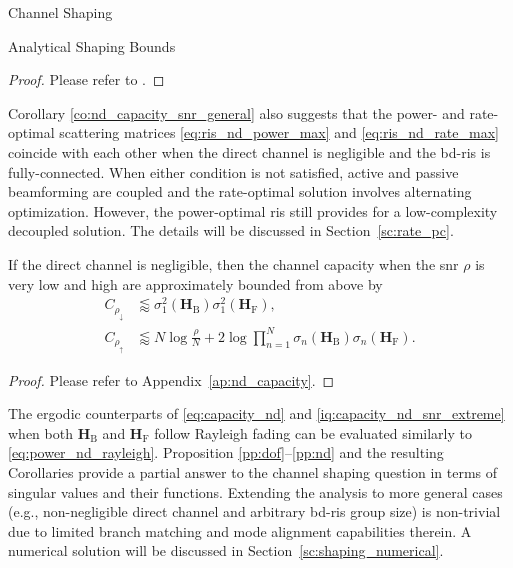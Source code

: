 \documentclass[journal]{IEEEtran}
\begin{document}
\begin{section}{Channel Shaping}
\begin{subsection}{Analytical Shaping Bounds}
		\begin{proof}
			Please refer to \cite[Appendix~A]{Bartoli2023}.
		\end{proof}

		Corollary \ref{co:nd_capacity_snr_general} also suggests that the power- and rate-optimal scattering matrices \eqref{eq:ris_nd_power_max} and \eqref{eq:ris_nd_rate_max} coincide with each other when the direct channel is negligible and the \gls{bd}-\gls{ris} is fully-connected.
		When either condition is not satisfied, active and passive beamforming are coupled and the rate-optimal solution involves alternating optimization.
		However, the power-optimal \gls{ris} still provides for a low-complexity decoupled solution.
		The details will be discussed in Section~\ref{sc:rate_pc}.

		\begin{corollary}
			\label{co:nd_capacity_snr_extreme}
			If the direct channel is negligible, then the channel capacity when the \gls{snr} $\rho$ is very low and high are approximately bounded from above by
			\begin{subequations}
				\label{iq:capacity_nd_snr_extreme}
				\begin{align}
					C_{\rho_\downarrow} & \lessapprox \sigma_1^2(\mathbf{H}_\mathrm{B}) \sigma_1^2(\mathbf{H}_\mathrm{F}), \label{iq:capacity_nd_snr_low}                                           \\
					C_{\rho_\uparrow}   & \lessapprox N \log \frac{\rho}{N} + 2 \log \prod_{n=1}^N \sigma_n(\mathbf{H}_\mathrm{B}) \sigma_n(\mathbf{H}_\mathrm{F}). \label{iq:capacity_nd_snr_high}
				\end{align}
			\end{subequations}
		\end{corollary}

		\begin{proof}
			Please refer to Appendix~\ref{ap:nd_capacity}.
		\end{proof}

		The ergodic counterparts of \eqref{eq:capacity_nd} and \eqref{iq:capacity_nd_snr_extreme} when both $\mathbf{H}_\mathrm{B}$ and $\mathbf{H}_\mathrm{F}$ follow Rayleigh fading can be evaluated similarly to \eqref{eq:power_nd_rayleigh}.
		Proposition \ref{pp:dof}--\ref{pp:nd} and the resulting Corollaries provide a partial answer to the channel shaping question in terms of singular values and their functions.
		Extending the analysis to more general cases (e.g., non-negligible direct channel and arbitrary \gls{bd}-\gls{ris} group size) is non-trivial due to limited branch matching and mode alignment capabilities therein.
		A numerical solution will be discussed in Section~\ref{sc:shaping_numerical}.
	\end{subsection}


\end{section}
\end{document}
